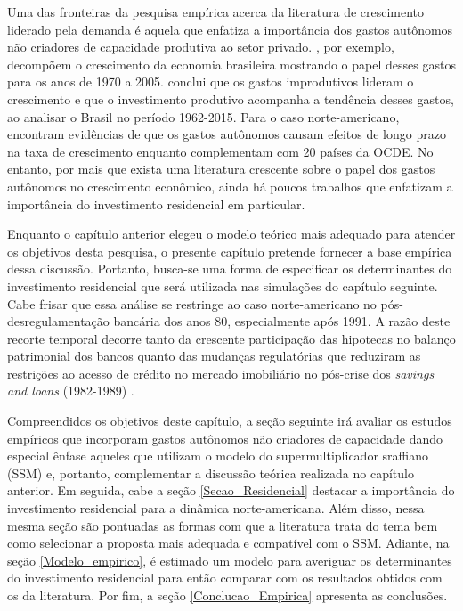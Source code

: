 Uma das fronteiras da pesquisa empírica acerca da literatura de crescimento liderado pela demanda é aquela que enfatiza a importância dos gastos autônomos não criadores de capacidade produtiva ao setor privado. \textcite{freitas_pattern_2013}, por exemplo, decompõem o crescimento da economia brasileira mostrando o papel desses gastos para os anos de  1970 a 2005. \textcite{braga_investment_2018} conclui que os gastos improdutivos lideram o crescimento e que o investimento produtivo acompanha a tendência desses gastos, ao analisar o Brasil no período 1962-2015. Para o caso norte-americano, \textcite{girardi_long-run_2016} encontram evidências de que os gastos autônomos causam efeitos de longo prazo na taxa de crescimento enquanto \textcite{girardi_autonomous_2018} complementam com 20 países da OCDE. No entanto, por mais que exista uma literatura crescente sobre o papel dos gastos autônomos no crescimento econômico, ainda há poucos trabalhos que enfatizam a importância do investimento residencial em particular. 

Enquanto o capítulo anterior elegeu o modelo teórico mais adequado para atender os objetivos desta pesquisa, o presente capítulo pretende fornecer a base empírica dessa discussão. Portanto, busca-se uma forma de especificar os determinantes do investimento residencial que será utilizada nas simulações do capítulo seguinte. 
Cabe frisar que essa análise se restringe ao caso norte-americano no pós-desregulamentação bancária dos anos 80, especialmente após 1991. 
A razão deste recorte temporal decorre tanto da crescente participação das hipotecas no balanço patrimonial dos bancos \cite{jorda_great_2014} quanto das mudanças regulatórias que reduziram as restrições ao acesso de crédito no mercado imobiliário no pós-crise dos \textit{savings and loans} (1982-1989) \cites{linneman_impacts_1989}{duca_empirical_1991}{federal_deposit_insurance_corporation_savings_1997}. 

Compreendidos os objetivos deste capítulo, a seção seguinte irá avaliar os estudos empíricos que incorporam gastos autônomos não criadores de capacidade dando especial ênfase aqueles que utilizam o modelo do supermultiplicador sraffiano (SSM) e, portanto, complementar a discussão teórica realizada no capítulo anterior. 
Em seguida, cabe a seção \ref{Secao_Residencial} destacar a importância do investimento residencial para a dinâmica norte-americana. Além disso, nessa mesma seção são pontuadas as formas com que a literatura trata do tema bem como selecionar a proposta mais adequada e compatível com o SSM. 
Adiante, na seção \ref{Modelo_empirico}, é estimado um modelo  para averiguar os determinantes do investimento residencial para então comparar com os resultados obtidos com os da literatura. Por fim, a seção \ref{Conclucao_Empirica} apresenta as conclusões.